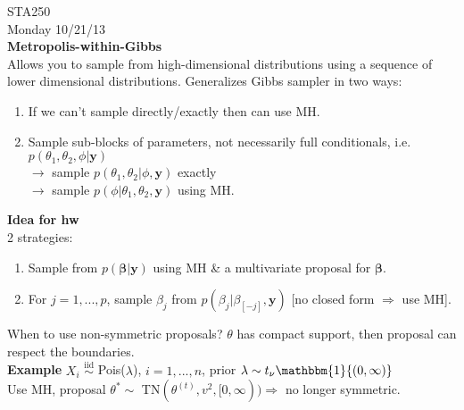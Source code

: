 \documentclass[11pt]{article}
\begin{document}
\noindent STA250\\
Monday 10/21/13\\

\noindent\textbf{\Large Metropolis-within-Gibbs}\\

\noindent Allows you to sample from high-dimensional distributions using a sequence of lower dimensional distributions. Generalizes Gibbs sampler in two ways:
\begin{enumerate}
\item If we can't sample directly/exactly then can use MH.
\item Sample sub-blocks of parameters, not necessarily full conditionals, i.e. $p(\theta_1,\theta_2,\phi|\mathbf{y})$\\
$\rightarrow$ sample $p(\theta_1,\theta_2|\phi,\mathbf{y})$ exactly\\
$\rightarrow$ sample $p(\phi|\theta_1,\theta_2,\mathbf{y})$ using MH.
\end{enumerate}
\textbf{Idea for hw}\\
2 strategies:
\begin{enumerate}
\item Sample from $p(\boldsymbol{\beta}|\mathbf{y})$ using MH \& a multivariate proposal for $\boldsymbol{\beta}$.
\item For $j=1,...,p$, sample $\beta_j$ from $p(\beta_j|\beta_{[-j]},\mathbf{y})$ [no closed form $\Rightarrow$ use MH].
\end{enumerate}
When to use non-symmetric proposals? $\theta$ has compact support, then proposal can respect the boundaries.\\

\noindent\textbf{Example} $X_i$ $\overset{\text{iid}}{\sim}$ Pois($\lambda$), $i=1,...,n$, prior $\lambda\sim t_{\nu}\mathbbm{1}\{(0,\infty)\}$\\
Use MH, proposal $\theta^*\sim$ TN$(\theta^{(t)},v^2,[0,\infty))\Rightarrow$ no longer symmetric.\\
\end{document}
